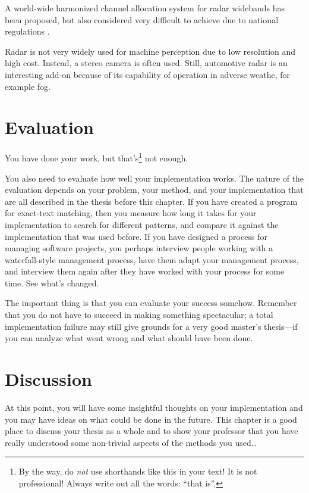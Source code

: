 \documentclass[12pt,a4paper,oneside,pdftex]{report}
\begin{document}
A world-wide harmonized channel allocation system for radar widebands has been proposed, but also considered very difficult to achieve due to national regulations \cite{Wenger07}.

Radar is not very widely used for machine perception due to low resolution and high cost. Instead, a stereo camera is often used. Still, automotive radar is an interesting add-on because of its capability of operation in adverse weathe, for example fog. 



% 

\chapter{Evaluation}
\label{chapter:evaluation}

You have done your work, but that's\footnote{By the way, do \emph{not} use
shorthands like this in your text! It is not professional! Always write out all
the words: ``that is''.} not enough.

You also need to evaluate how well your implementation works.  The
nature of the evaluation depends on your problem, your method, and
your implementation that are all described in the thesis before this
chapter.  If you have created a program for exact-text matching, then
you measure how long it takes for your implementation to search for
different patterns, and compare it against the implementation that was
used before.  If you have designed a process for managing software
projects, you perhaps interview people working with a waterfall-style
management process, have them adapt your management process, and
interview them again after they have worked with your process for some
time. See what's changed.

The important thing is that you can evaluate your success somehow.
Remember that you do not have to succeed in making something spectacular; a
total implementation failure may still give grounds for a very good master's
thesis---if you can analyze what went wrong and what should have been done.




% 

\chapter{Discussion}
\label{chapter:discussion}

At this point, you will have some insightful thoughts on your implementation
and you may have ideas on what could be done in the future.
This chapter is a good place to discuss your thesis as a whole and to show your
professor that you have really understood some non-trivial aspects of the
methods you used\ldots
\end{document}
